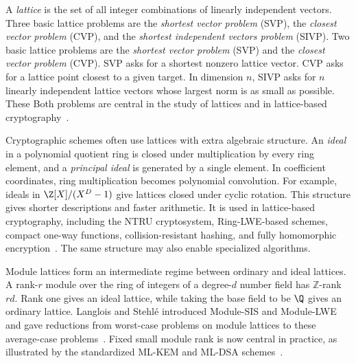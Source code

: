 A \emph{lattice} is the set of all integer combinations of
linearly independent vectors.
\ifdefined\withModuleSIVP
{Three basic lattice problems are the \emph{shortest vector
problem} (SVP), the \emph{closest vector problem} (CVP), and the
\emph{shortest independent vectors problem} (SIVP).}
\else
Two basic lattice problems are the
\emph{shortest vector problem} (SVP) and the
\emph{closest vector problem} (CVP).
\fi
SVP asks for a shortest nonzero lattice
vector.  CVP asks for a lattice point closest to a given target.
\ifdefined\withModuleSIVP
{In dimension \(n\), SIVP asks for \(n\) linearly independent
lattice vectors whose largest norm is as small as possible.  These}
\else
Both
\fi
 problems are central in the study of lattices and in lattice-based
 cryptography~\cite{MicciancioGoldwasser2002}.

Cryptographic schemes often use lattices with extra algebraic structure.  An
\emph{ideal} in a polynomial quotient ring is closed under
multiplication by every ring element, and a \emph{principal ideal}
is generated by a single element.  In
coefficient coordinates, ring multiplication becomes polynomial convolution.
For example, ideals in \(\Z[X]/(X^D-1)\) give lattices closed under cyclic
rotation.  This structure gives shorter descriptions and faster arithmetic.
It is used in lattice-based cryptography, including the NTRU cryptosystem,
Ring-LWE-based schemes, compact one-way functions, collision-resistant hashing,
and fully homomorphic encryption~\cite{HoffsteinPipherSilverman1998,LyubashevskyPeikertRegev2010,Micciancio2002,PeikertRosen2006,LyubashevskyMicciancio2006,Gentry2009}.  The same structure may
also enable specialized algorithms.

\ifdefined\withModuleSIVP
{Module lattices form an intermediate regime between ordinary
and ideal lattices.  A rank-\(r\) module over the ring of integers of a
degree-\(d\) number field has \(\mathbb Z\)-rank \(rd\).  Rank one gives an
ideal lattice, while taking the base field to be \(\Q\) gives an ordinary
lattice.  Langlois and Stehl\'e introduced Module-SIS and Module-LWE and gave
reductions from worst-case problems on module lattices to these average-case
problems~\cite{LangloisStehle2015}.  Fixed small module rank is now central in
practice, as illustrated by the standardized ML-KEM and ML-DSA
schemes~\cite{NISTFIPS203,NISTFIPS204}.}
\fi

